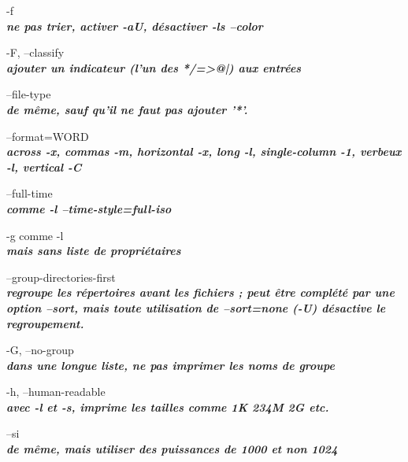 \documentclass{article}
\begin{document}
       \par-f \\
		 \textit{\textbf{ne pas trier, activer -aU, désactiver -ls --color}}\\

       \par -F, --classify\\
               \textit{\textbf{ajouter un indicateur (l'un des */=>@|) aux entrées}}\\

      \par --file-type\\
              \textit{\textbf{de même, sauf qu'il ne faut pas ajouter '*'.}}\\

       \par --format=WORD\\
              \textit{\textbf{across -x, commas -m, horizontal -x, long -l, single-column -1,
              verbeux -l, vertical -C}}\\

       \par --full-time\\
              \textit{\textbf{comme -l --time-style=full-iso}}\\

       \par-g comme -l\\
	 \textit{\textbf{mais sans liste de propriétaires}}\\

       \par --group-directories-first\\
              \textit{\textbf{regroupe les répertoires avant les fichiers ;
		peut être complété par une option --sort, mais toute utilisation de
              --sort=none (-U) désactive le regroupement.}}\\

       \par -G, --no-group\\
               \textit{\textbf{dans une longue liste, ne pas imprimer les noms de groupe}}\\

       \par-h, --human-readable\\
               \textit{\textbf{avec -l et -s, imprime les tailles comme 1K 234M 2G etc.}}\\

       \par--si \\
		 \textit{\textbf{de même, mais utiliser des puissances de 1000 et non 1024}}\\
\end{document}
